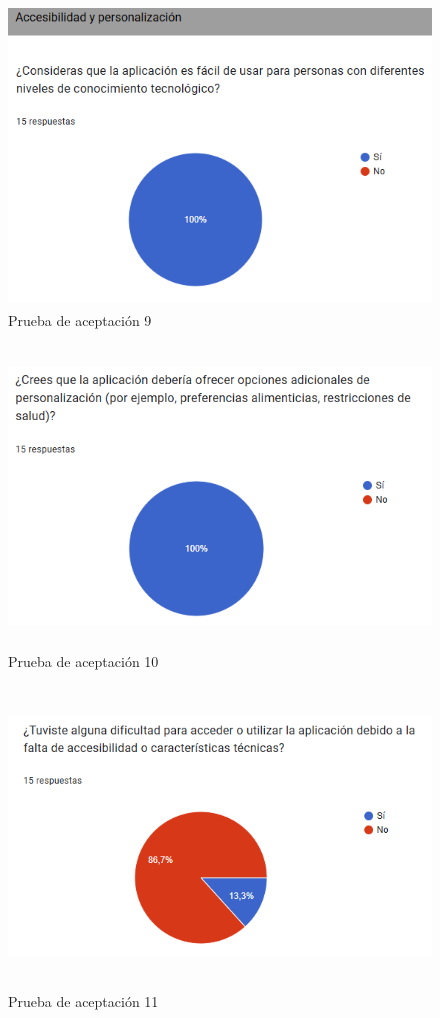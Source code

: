 \begin{figure}[H]
    \centering
    \includegraphics[height=8cm]{img/validacion/aceptacion9.png}
    \caption{Prueba de aceptaci\'on 9}
    \label{fig:aceptacion9}
\end{figure}

\begin{figure}[H]
    \centering
    \includegraphics[height=8cm]{img/validacion/aceptacion10.png}
    \caption{Prueba de aceptaci\'on 10}
    \label{fig:aceptacion10}
\end{figure}

\begin{figure}[H]
    \centering
    \includegraphics[height=8cm]{img/validacion/aceptacion11.png}
    \caption{Prueba de aceptaci\'on 11}
    \label{fig:aceptacion11}
\end{figure}

